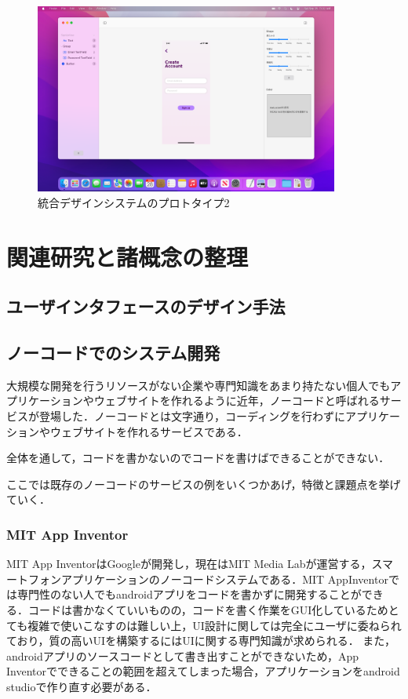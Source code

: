 \begin{figure}[htbp]
  \begin{minipage}{\hsize}
    \begin{center}
       \includegraphics[width=100mm]{img/autogen-integrated2.png}
    \end{center}
    \caption{統合デザインシステムのプロトタイプ2}
    \label{fig:autogen-integrated2}
  \end{minipage}
\end{figure}

\chapter{関連研究と諸概念の整理}
\label{chap:prevresearch}

\section{ユーザインタフェースのデザイン手法}


\section{ノーコードでのシステム開発}
大規模な開発を行うリソースがない企業や専門知識をあまり持たない個人でもアプリケーションやウェブサイトを作れるように近年，ノーコードと呼ばれるサービスが登場した．ノーコードとは文字通り，コーディングを行わずにアプリケーションやウェブサイトを作れるサービスである．

全体を通して，コードを書かないのでコードを書けばできることができない．


ここでは既存のノーコードのサービスの例をいくつかあげ，特徴と課題点を挙げていく．

\subsection{MIT App Inventor}
MIT App Inventor\cite{mitappinventor}はGoogleが開発し，現在はMIT Media Labが運営する，スマートフォンアプリケーションのノーコードシステムである．MIT AppInventorでは専門性のない人でもandroidアプリをコードを書かずに開発することができる．コードは書かなくていいものの，コードを書く作業をGUI化しているためとても複雑で使いこなすのは難しい上，UI設計に関しては完全にユーザに委ねられており，質の高いUIを構築するにはUIに関する専門知識が求められる．
また，androidアプリのソースコードとして書き出すことができないため，App Inventorでできることの範囲を超えてしまった場合，アプリケーションをandroid studioで作り直す必要がある．
